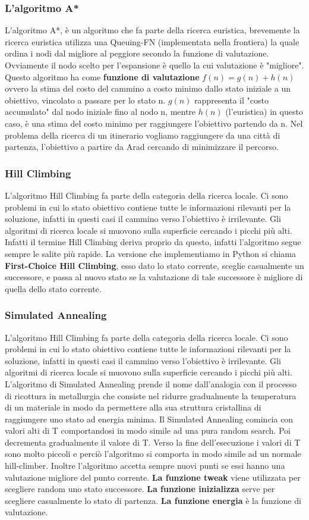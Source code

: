 \documentclass{article}
\begin{document}
\subsubsection{L'algoritmo A*}
L'algoritmo A*, è un algoritmo che fa parte della ricerca euristica, brevemente la ricerca euristica utilizza una Queuing-FN (implementata nella frontiera) la quale ordina i nodi dal migliore al peggiore secondo la funzione di valutazione. Ovviamente il nodo scelto per l'espansione è quello la cui valutazione è "migliore". Questo algoritmo ha come \textbf{funzione di valutazione} $f(n)=g(n)+h(n)$ ovvero la stima del costo del cammino a costo minimo dallo stato iniziale a un obiettivo, vincolato a passare per lo stato n. $g(n)$ rappresenta il "costo accumulato" dal nodo iniziale fino al nodo n, mentre $h(n)$ (l'euristica) in questo caso, è una stima del costo minimo per raggiungere l'obiettivo partendo da n.
Nel problema della ricerca di un itinerario vogliamo raggiungere da una città di partenza, l'obiettivo a partire da Arad cercando di minimizzare il percorso.
\subsubsection{Hill Climbing}
L'algoritmo Hill Climbing fa parte della categoria della ricerca locale. Ci sono problemi in cui lo stato obiettivo contiene tutte le informazioni rilevanti per la soluzione, infatti in questi casi il cammino verso l'obiettivo è irrilevante. Gli algoritmi di ricerca locale si muovono sulla superficie cercando i picchi più alti. Infatti il termine Hill Climbing deriva proprio da questo, infatti l'algoritmo segue sempre le salite più rapide. La versione che implementiamo in Python si chiama \textbf{First-Choice Hill Climbing}, esso dato lo stato corrente, sceglie casualmente un successore, e passa al nuovo stato se la valutazione di tale successore è migliore di quella dello stato corrente.
\subsubsection{Simulated Annealing}
L'algoritmo Hill Climbing fa parte della categoria della ricerca locale. Ci sono problemi in cui lo stato obiettivo contiene tutte le informazioni rilevanti per la soluzione, infatti in questi casi il cammino verso l'obiettivo è irrilevante. Gli algoritmi di ricerca locale si muovono sulla superficie cercando i picchi più alti.
L'algoritmo di Simulated Annealing prende il nome dall'analogia con il processo di ricottura in metallurgia che consiste nel ridurre gradualmente la temperatura di un materiale in modo da permettere alla sua struttura cristallina di raggiungere uno stato ad energia minima. Il Simulated Annealing comincia con valori alti di T comportandosi in modo simile ad una pura random search. Poi decrementa gradualmente il valore di T. Verso la fine dell'esecuzione i valori di T sono molto piccoli e perciò l'algoritmo si comporta in modo simile ad un normale hill-climber. Inoltre l'algoritmo accetta sempre nuovi punti se essi hanno una valutazione migliore del punto corrente. \textbf{La funzione tweak} viene utilizzata per scegliere random uno stato successore. \textbf{La funzione inizializza} serve per scegliere casualmente lo stato di partenza. \textbf{La funzione energia} è la funzione di valutazione.
\end{document}
